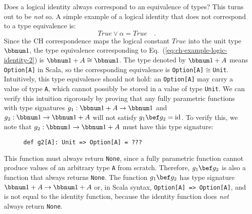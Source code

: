 Does a logical identity always correspond to an equivalence of types?
This turns out to be \emph{not} so. A simple example of a logical
identity that does not correspond to a type equivalence is:
\begin{equation}
True\vee\alpha=True\quad.\label{eq:ch-example-logic-identity-2}
\end{equation}
Since the CH correspondence maps the logical constant $True$ into
the unit type $\bbnum 1$, the type equivalence corresponding to Eq.~(\ref{eq:ch-example-logic-identity-2})
is $\bbnum 1+A\cong\bbnum 1$. The type denoted by $\bbnum 1+A$ means
\lstinline!Option[A]! in Scala, so the corresponding equivalence
is \lstinline!Option[A]!$\cong$\lstinline!Unit!. Intuitively, this
type equivalence should not hold: an \lstinline!Option[A]! may carry
a value of type \lstinline!A!, which cannot possibly be stored in
a value of type \lstinline!Unit!. We can verify this intuition rigorously
by proving that any fully parametric functions with type signatures
$g_{1}:\bbnum 1+A\rightarrow\bbnum 1$ and $g_{2}:\bbnum 1\rightarrow\bbnum 1+A$
will not satisfy $g_{1}\bef g_{2}=\text{id}$. To verify this, we
note that $g_{2}:\bbnum 1\rightarrow\bbnum 1+A$ must have this type
signature:

\begin{wrapfigure}{l}{0.4\columnwidth}%
\vspace{-0.8\baselineskip}
\begin{lstlisting}
def g2[A]: Unit => Option[A] = ???
\end{lstlisting}

\vspace{-1\baselineskip}
\end{wrapfigure}%

\noindent This function must always return \lstinline!None!, since
a fully parametric function cannot produce values of an arbitrary
type \lstinline!A! from scratch. Therefore, $g_{1}\bef g_{2}$ is
also a function that always returns \lstinline!None!. The function
$g_{1}\bef g_{2}$ has type signature $\bbnum 1+A\rightarrow\bbnum 1+A$
or, in Scala syntax, \lstinline!Option[A] => Option[A]!, and is not
equal to the identity function, because the identity function does
\emph{not} always return \lstinline!None!.

